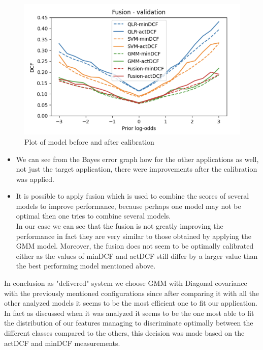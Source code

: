 \documentclass{article}
\begin{document}
\begin{figure}[H]
\begin{minipage}{.4\textwidth}
    \end{minipage}
    \begin{minipage}{.4\textwidth}
        \centering
        \includegraphics[width=\linewidth]{./img/Cal4.png}
    \end{minipage}
    \caption{Plot of model before and after calibration} %
    \label{fig:CalMod} %
\end{figure}
\begin{itemize}
    \item We can see from the Bayes error graph how for the other applications as well, not just the target application, there were improvements after the calibration was applied.
    \item It is possible to apply fusion which is used to combine the scores of several models to improve performance, because perhaps one model may not be optimal then one tries to combine several models.\\In our case we can see that the fusion is not greatly improving the performance in fact they are very similar to those obtained by applying the GMM model. Moreover, the fusion does not seem to be optimally calibrated either as the values of minDCF and actDCF still differ by a larger value than the best performing model mentioned above.
\end{itemize}
In conclusion as "delivered" system we choose GMM with Diagonal covariance with the previously mentioned configurations since after comparing it with all the other analyzed models it seems to be the most efficient one to fit our application. In fact as discussed when it was analyzed it seems to be the one most able to fit the distribution of our features managing to discriminate optimally between the different classes compared to the others, this decision was made based on the actDCF and minDCF measurements.
\end{document}
